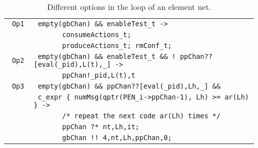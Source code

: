 \documentclass{llncs}
\begin{document}
\small
\begin{table}[h!]
\begin{center}\begin{tabular}{|l|l|}
      \hline
      \verb" Op1 "  & \verb" empty(gbChan) && enableTest_t -> "  \\
                    & \verb"       consumeActions_t;"  \\
                    & \verb"       produceActions_t; rmConf_t;"  \\
      \hline
      \verb" Op2 "  & \verb" empty(gbChan) && enableTest_t && ! ppChan??[eval(_pid),L(t),_] ->  "\\
                    & \verb"       ppChan!_pid,L(t),t" \\
      \hline
      \verb" Op3 "  & \verb" empty(gbChan) && ppChan??[eval(_pid),Lh,_] && "  \\
                    & \verb" c_expr { numMsg(qptr(PEN_i->ppChan-1), Lh) >= ar(Lh) } ->  "  \\
                    & \verb"       /* repeat the next code ar(Lh) times */ "  \\
                    & \verb"       ppChan ?* nt,Lh,it; "  \\
                    & \verb"       gbChan !! 4,nt,Lh,ppChan,0; "  \\
      \hline
\end{tabular}\end{center}
\caption{Different options in the loop of an element net.}
\label{tab.opt.el.net.wo.p}
\end{table}
\normalsize
\end{document}
